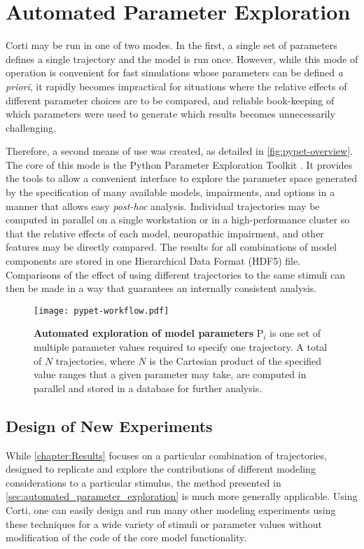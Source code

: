 \section{Automated Parameter Exploration} %
\label{sec:automated_parameter_exploration}
Corti may be run in one of two modes.  In the first, a single set of parameters defines a single trajectory and the model is run once.   However, while this mode of operation is convenient for fast simulations whose parameters can be defined \emph{a priori}, it rapidly becomes impractical for situations where the relative effects of different parameter choices are to be compared, and reliable book-keeping of which parameters were used to generate which results becomes unnecessarily challenging.

Therefore, a second means of use was created, as detailed in \autoref{fig:pypet-overview}. The core of this mode is the Python Parameter Exploration Toolkit \citep{Meyer2016Pypet}. It provides the tools to allow a convenient interface to explore the parameter space generated by the specification of many available models, impairments, and options in a manner that allows easy \emph{post-hoc} analysis. Individual trajectories may be computed in parallel on a single workstation or in a high-performance cluster so that the relative effects of each model, neuropathic impairment, and other features may be directly compared.  The results for all combinations of model components are stored in one Hierarchical Data Format (HDF5) file.  Comparisons of the effect of using different trajectories to the same stimuli can then be made in a way that guarantees an internally consistent analysis.

\begin{figure}[htbp]
	\centering
	\texttt{[image: pypet-workflow.pdf]}
	\caption[Automated Exploration of Model Parameters]{\textbf{Automated exploration of model parameters} P$_i$ is one set of multiple parameter values required to specify one trajectory.  A total of $N$ trajectories, where $N$ is the Cartesian product of the specified value ranges that a given parameter may take, are computed in parallel and stored in a database for further analysis. }
	\label{fig:pypet-overview}
\end{figure}
\subsection{Design of New Experiments} %
\label{sub:design_of_new_experiments}
While \autoref{chapter:Results} focuses on a particular combination of trajectories, designed to replicate and explore the contributions of different modeling considerations to a particular stimulus, the method presented in \autoref{sec:automated_parameter_exploration} is much more generally applicable.  Using Corti, one can easily design and run many other modeling experiments using these techniques for a wide variety of stimuli or parameter values without modification of the code of the core model functionality. 
